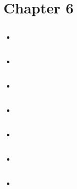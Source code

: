 \documentclass{article}
\begin{document}
    \section{Chapter 6}

    \subsection{}
    \begin{itemize}
        \item 
    \end{itemize}

    \subsection{}
    \begin{itemize}
        \item 
    \end{itemize}

    \subsection{}
    \begin{itemize}
        \item 
    \end{itemize}

    \subsection{}
    \begin{itemize}
        \item 
    \end{itemize}

    \subsection{}
    \begin{itemize}
        \item 
    \end{itemize}

    \subsection{}
    \begin{itemize}
        \item 
    \end{itemize}

    \subsection{}
    \begin{itemize}
        \item 
    \end{itemize}
\end{document}
